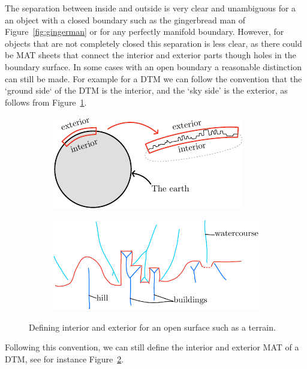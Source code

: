 The separation between inside and outside is very clear and unambiguous for a an object with a closed boundary such as the gingerbread man of Figure~\ref{fig:gingerman} or for any perfectly manifold boundary.
However, for objects that are not completely closed this separation is less clear, as there could be MAT sheets that connect the interior and exterior parts though holes in the boundary surface.
In some cases with an open boundary a reasonable distinction can still be made.
For example for a DTM we can follow the convention that the `ground side` of the DTM is the interior, and the `sky side' is the exterior, as follows from Figure~\ref{fig:object_earth}.
\begin{figure}
	\centering
	\begin{subfigure}{0.4\linewidth}
		\includegraphics[width=\linewidth]{figs/object_earth.pdf}
	\label{fig:object_earth}
	\end{subfigure}
	\quad
	\begin{subfigure}{0.57\linewidth}
		\includegraphics[width=\linewidth]{figs/MAT_hierarchy.pdf}
		\label{fig:matterrain}
	\end{subfigure}
	\caption{Defining interior and exterior for an open surface such as a terrain.}
	\label{fig:intext}
\end{figure}
Following this convention, we can still define the interior and exterior MAT of a DTM, see for instance Figure~\ref{fig:matterrain}.

